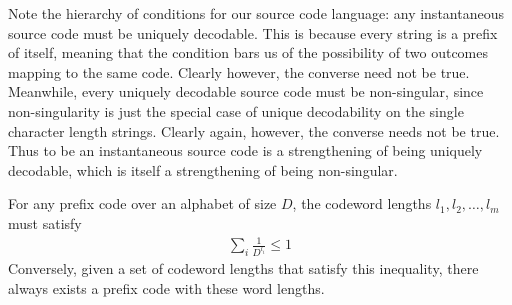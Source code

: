 Note the hierarchy of conditions for our source code language: any instantaneous source code must be uniquely decodable. This is because every string is a prefix of itself, meaning that the condition bars us of the possibility of two outcomes mapping to the same code. Clearly however, the converse need not be true. Meanwhile, every uniquely decodable source code must be non-singular, since non-singularity is just the special case of unique decodability on the single character length strings. Clearly again, however, the converse needs not be true. Thus to be an instantaneous source code is a strengthening of being uniquely decodable, which is itself a strengthening of being non-singular. 
\begin{theorem}
	For any prefix code over an alphabet of size $D$, the codeword lengths $l_1,l_2,\ldots,l_m$ must satisfy 
	\begin{align}
		\sum_i \frac{1}{D^{l_i}} \leq 1
	\end{align}
Conversely, given a set of codeword lengths that satisfy this inequality, there always exists a prefix code with these word lengths. 
\end{theorem}
